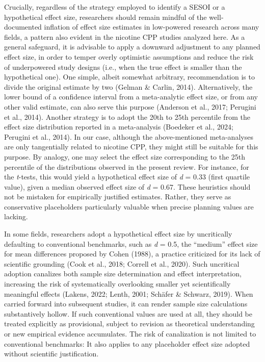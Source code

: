 \documentclass[authordate, meta]{jote-new-article}
\begin{document}
	Crucially, regardless of the strategy employed to identify a SESOI or a hypothetical effect size, researchers should remain mindful of the well-documented inflation of effect size estimates in low-powered research across many fields, a pattern also evident in the nicotine CPP studies analyzed here. As a general safeguard, it is advisable to apply a downward adjustment to any planned effect size, in order to temper overly optimistic assumptions and reduce the risk of underpowered study designs (i.e., when the true effect is smaller than the hypothetical one). One simple, albeit somewhat arbitrary, recommendation is to divide the original estimate by two (Gelman \& Carlin, 2014). Alternatively, the lower bound of a confidence interval from a meta-analytic effect size, or from any other valid estimate, can also serve this purpose (Anderson et al., 2017; Perugini et al., 2014). Another strategy is to adopt the 20th to 25th percentile from the effect size distribution reported in a meta-analysis (Boedeker et al., 2024; Perugini et al., 2014). In our case, although the above-mentioned meta-analyses are only tangentially related to nicotine CPP, they might still be suitable for this purpose. By analogy, one may select the effect size corresponding to the 25th percentile of the distributions observed in the present review. For instance, for the \emph{t}-tests, this would yield a hypothetical effect size of \emph{d} = 0.33 (first quartile value), given a median observed effect size of \emph{d} = 0.67. These heuristics should not be mistaken for empirically justified estimates. Rather, they serve as conservative placeholders particularly valuable when precise planning values are lacking.



	In some fields, researchers adopt a hypothetical effect size by uncritically defaulting to conventional benchmarks, such as \emph{d} = 0.5, the “medium” effect size for mean differences proposed by Cohen (1988), a practice criticized for its lack of scientific grounding (Cook et al., 2018; Correll et al., 2020). Such uncritical adoption canalizes both sample size determination and effect interpretation, increasing the risk of systematically overlooking smaller yet scientifically meaningful effects (Lakens, 2022; Lenth, 2001; Schäfer \& Schwarz, 2019). When carried forward into subsequent studies, it can render sample size calculations substantively hollow. If such conventional values are used at all, they should be treated explicitly as provisional, subject to revision as theoretical understanding or new empirical evidence accumulates. The risk of canalization is not limited to conventional benchmarks: It also applies to any placeholder effect size adopted without scientific justification.
\end{document}
